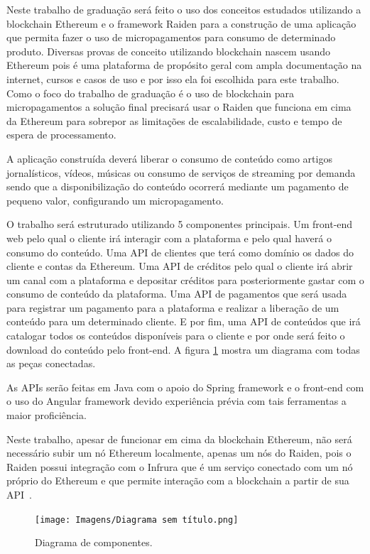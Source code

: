 \documentclass[12pt]{article}
\begin{document}
Neste trabalho de graduação será feito o uso dos conceitos estudados utilizando a blockchain Ethereum e o framework Raiden para a construção de uma aplicação que permita fazer o uso de micropagamentos para consumo de determinado produto. Diversas provas de conceito utilizando blockchain nascem usando Ethereum pois é uma plataforma de propósito geral com ampla documentação na internet, cursos e casos de uso e por isso ela foi escolhida para este trabalho. Como o foco do trabalho de graduação é o uso de blockchain para micropagamentos a solução final precisará usar o Raiden que funciona em cima da Ethereum para sobrepor as limitações de escalabilidade, custo e tempo de espera de processamento. 

A aplicação construída deverá liberar o consumo de conteúdo como artigos jornalísticos, vídeos, músicas ou consumo de serviços de streaming por demanda sendo que a disponibilização do conteúdo ocorrerá mediante um pagamento de pequeno valor, configurando um micropagamento.

O trabalho será estruturado utilizando 5 componentes principais. Um front-end web pelo qual o cliente irá interagir com a plataforma e pelo qual haverá o consumo do conteúdo. Uma API de clientes que terá como domínio os dados do cliente e contas da Ethereum. Uma API de créditos pelo qual o cliente irá abrir um canal com a plataforma e depositar créditos para posteriormente gastar com o consumo de conteúdo da plataforma. Uma API de pagamentos que será usada para registrar um pagamento para a plataforma e realizar a liberação de um conteúdo para um determinado cliente. E por fim, uma API de conteúdos que irá catalogar todos os conteúdos disponíveis para o cliente e por onde será feito o download do conteúdo pelo front-end. A figura \ref{fig:diagrama_componentes} mostra um diagrama com todas as peças conectadas.

As APIs serão feitas em Java com o apoio do Spring framework e o front-end com o uso do Angular framework devido experiência prévia com tais ferramentas a maior proficiência. 

Neste trabalho, apesar de funcionar em cima da blockchain Ethereum, não será necessário subir um nó Ethereum localmente, apenas um nós do Raiden, pois o Raiden possui integração com o Infrura que é um serviço conectado com um nó próprio do Ethereum e que permite interação com a blockchain a partir de sua API~\cite{infura2021oficial}.  

\begin{figure}[H]
    \centering
    \texttt{[image: Imagens/Diagrama sem título.png]}
    \caption{Diagrama de componentes.}
    \label{fig:diagrama_componentes}
\end{figure}
\end{document}
